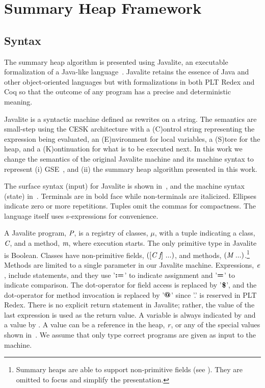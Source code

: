 \section{Summary Heap Framework}
\subsection{Syntax}
The summary heap algorithm is presented using Javalite, an
executable formalization of a Java-like language~\cite{saints-MS}. Javalite retains 
the essence of Java and other object-oriented languages but with formalizations 
in both PLT Redex and Coq so that the outcome of any program has a precise
and deterministic meaning.

Javalite is a syntactic machine defined as rewrites on a string.  The
semantics are small-step using the CESK architecture with a (C)ontrol string
representing the expression being evaluated, an (E)nvironment for
local variables, a (S)tore for the heap, and a (K)ontinuation for what
is to be executed next.  In this work we change the semantics of the original
 Javalite machine and its machine syntax to represent (i) GSE~\cite{GSE03}, and (ii) the summary heap algorithm
presented in this work.

The surface syntax (input) for Javalite is shown 
in~, and the machine syntax (state)
in~. Terminals are in bold face while
non-terminals are italicized. Ellipses indicate zero or more
repetitions. Tuples omit the commas for compactness. The language
itself uses s-expressions for convenience.




A Javalite program, $\emph{P}$, is a registry of classes, $\mu$, with
a tuple indicating a class, $\emph{C}$, and a method, $\emph{m}$,
where execution starts. The only primitive type in Javalite is
Boolean. Classes have non-primitive fields, $([\cfgnt{C}\ \cfgnt{f}]\ ...)$, and
methods, $(\cfgnt{M}\ ...)$.\footnote{Summary heaps are able to support non-primitive fields (see ). They are omitted to focus and simplify the presentation.} Methods are limited to a single
parameter in our Javalite machine. Expressions, $\emph{e}$,  
include statements, and they
 use '$\textbf{:=}$' to indicate assignment and '$\textbf{=}$' to indicate comparison.
The dot-operator for field access is replaced by '$\textbf{\$}$', and the dot-operator
for method invocation is replaced by '$\textbf{@}$' since '.' is reserved in PLT Redex. There is no explicit return
statement in Javalite; rather, the value of the last expression is
used as the return value. A variable is always indicated by 
and a value by . A value can be a reference in the heap, $\emph{r}$, or any of the special values shown in~. 
We assume that only
type correct programs are given as input to the machine.

